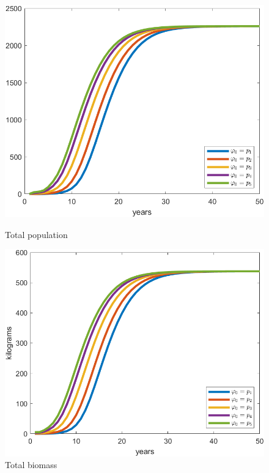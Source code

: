 \begin{figure}[H]
	\centering
	\begin{minipage}{.48\textwidth}
		\includegraphics[width=\linewidth]{Images/F=1/total_pop_when_f=1}
		\caption{Total population}
		\label{fig:totalpopwhenf=1}
	\end{minipage} \quad 
	\centering
	\begin{minipage}{.48\textwidth}
		\includegraphics[width=\linewidth]{Images/F=1/total_biomass_when_f=1}
		\caption{Total biomass}
		\label{fig:totalbiomasswhenf=1}
	\end{minipage}
\end{figure}

